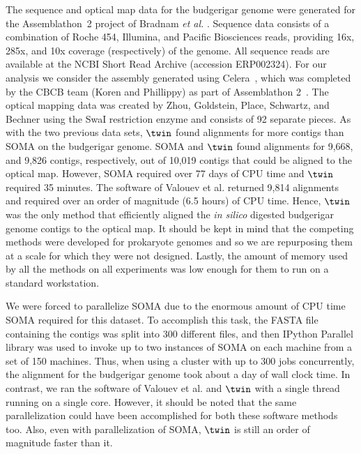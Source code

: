 \documentclass[doctor]{thesis}
\begin{document}
The sequence and optical map data for the budgerigar genome were generated for the Assemblathon~2 project of Bradnam {\em et al.} \cite{bradnam2013assemblathon}.   Sequence data consists of  a combination of Roche 454, Illumina, and Pacific Biosciences reads, providing 16x, 285x, and 10x coverage (respectively) of the genome.  All sequence reads are available at the NCBI Short Read Archive (accession  ERP002324).  For our analysis we consider the assembly generated using Celera~\cite{celera}, which was completed by the CBCB team (Koren and Phillippy) as part of  Assemblathon 2~\cite{bradnam2013assemblathon}.  The optical mapping data was created by Zhou, Goldstein, Place, Schwartz, and Bechner using the SwaI restriction enzyme and consists of 92 separate pieces. 
As with the two previous data sets, $\twin$ found alignments for more contigs than SOMA on the budgerigar genome.  SOMA and $\twin$ found alignments for 9,668, and 9,826 contigs, respectively, out of 10,019 contigs that could be aligned to the optical map.  However,  SOMA required over 77 days of CPU time and $\twin$ required 35 minutes.  The software of Valouev et al. returned 9,814 alignments and required over an order of magnitude (6.5 hours) of CPU time.  Hence, $\twin$ was the only method that efficiently aligned the {\em in silico} digested budgerigar genome contigs to the optical map.  It should be kept in mind that the competing methods were developed for prokaryote genomes and so we are repurposing them at a scale for which they were not designed.   Lastly, the amount of memory used by all the methods on all experiments was low enough for them to run on a standard workstation.  

We were forced to parallelize SOMA due to the enormous amount of CPU time SOMA required for this dataset.  To accomplish this task, the FASTA file containing the contigs was split into 300 different files, and then IPython Parallel library was used to invoke up to two instances of SOMA on each machine from a set of 150 machines.  Thus, when using a cluster with up to 300 jobs concurrently, the alignment for the budgerigar genome took about a day of wall clock time. In contrast, we ran the software of Valouev et al. and $\twin$ with a single thread running on a single core.  However, it should be noted that the same parallelization could have been accomplished for both these software methods too. Also, even with parallelization of SOMA, $\twin$ is still an order of magnitude faster than it.
\end{document}
